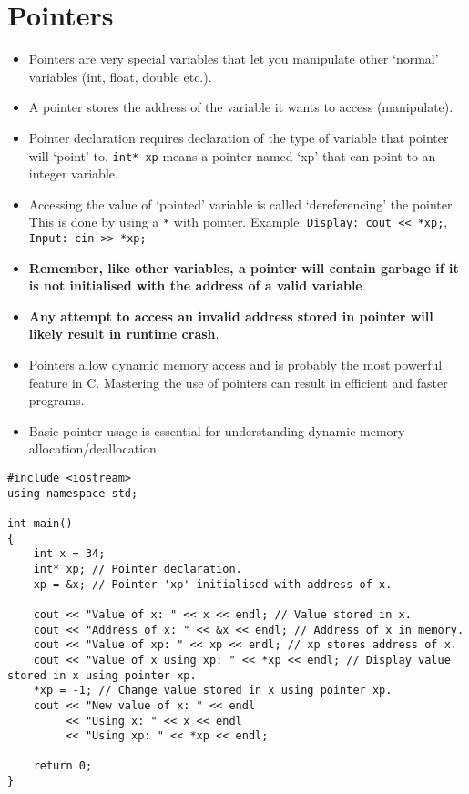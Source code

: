 \documentclass[12pt,a4paper]{article}
\begin{document}
\section{Pointers}
\begin{itemize}
\item Pointers are very special variables that let you manipulate other `normal' variables (int, float, double etc.).
\item A pointer stores the address of the variable it wants to access (manipulate).
\item Pointer declaration requires declaration of the type of variable that pointer will `point' to. \verb|int* xp| means a pointer named `xp' that can point to an integer variable.
\item Accessing the value of `pointed' variable is called `dereferencing' the pointer. This is done by using a \verb|*| with pointer. Example: \verb|Display: cout << *xp;|, \verb|Input: cin >> *xp;|
\item \textbf{Remember, like other variables, a pointer will contain garbage if it is not initialised with the address of a valid variable}.
\item \textbf{Any attempt to access an invalid address stored in pointer will likely result in runtime crash}.
\item Pointers allow dynamic memory access and is probably the most powerful feature in C. Mastering the use of pointers can result in efficient and faster programs.
\item Basic pointer usage is essential for understanding dynamic memory allocation/deallocation.
\end{itemize}
\begin{lstlisting}[caption={Pointer Basics}]
#include <iostream>
using namespace std;

int main()
{
	int x = 34;
	int* xp; // Pointer declaration.
	xp = &x; // Pointer 'xp' initialised with address of x.
	
	cout << "Value of x: " << x << endl; // Value stored in x.
	cout << "Address of x: " << &x << endl; // Address of x in memory.
	cout << "Value of xp: " << xp << endl; // xp stores address of x.
	cout << "Value of x using xp: " << *xp << endl; // Display value stored in x using pointer xp.
	*xp = -1; // Change value stored in x using pointer xp.
	cout << "New value of x: " << endl
		 << "Using x: " << x << endl
		 << "Using xp: " << *xp << endl; 
	
	return 0;
}
\end{lstlisting}
\end{document}
